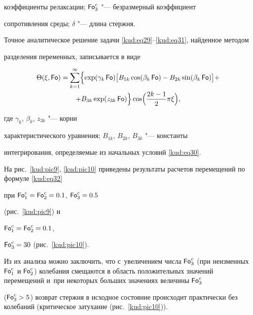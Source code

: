 коэффициенты релаксации; $\operatorname{\sf Fo}_3^c$ "--- безразмерный коэффициент

сопротивления среды; $ \delta$ "--- длина стержня.



Точное аналитическое решение задачи \eqref{kud:eq29}--\eqref{kud:eq31}, найденное методом

разделения переменных, записывается в виде

\begin{multline}

\label{kud:eq32}

\Theta( \xi,\operatorname{\sf Fo})=\sum\limits_{k=1}^\infty \Bigl\{

\exp (\gamma_k \operatorname{\sf Fo})

\bigl[ B_{1k} \cos ( \beta_k \operatorname{\sf Fo})-B_{2k}  \sin ( \beta _k \operatorname{\sf Fo}) \bigr]+\\

+  B_{3k} \exp (z_{3k} \operatorname{\sf Fo}) \Bigr\} \cos \Bigl(\frac{2k-1}2 \pi \xi \Bigr),

\end{multline}

где $ {\gamma }_k $, $\beta_k$, $z_{3k} $ "--- корни

характеристического уравнения; $B_{1k}$, $B_{2k}$, $B_{3k}$ "--- константы

интегрирования, определяемые из начальных условий \eqref{kud:eq30}.



На рис.~\ref{kud:pic9}, \ref{kud:pic10} приведены результаты расчетов перемещений по формуле \eqref{kud:eq32}

при $\operatorname{\sf Fo}_ 1^c =\operatorname{\sf Fo}_2^c =0.1$, $\operatorname{\sf Fo}_{3}^c =0.5$

(рис.~\ref{kud:pic9}) и 

$\operatorname{\sf Fo}_ 1^c =\operatorname{\sf Fo}_2^c =0.1$, 

$\operatorname{\sf Fo}_3^c=30$ (рис.~\ref{kud:pic10}). 

Из их анализа можно заключить, что с~увеличением числа $\operatorname{\sf Fo}_3 ^c$ (при неизменных $\operatorname{\sf Fo}_1^c$ и $\operatorname{\sf Fo}_2^c$) колебания смещаются в область положительных значений перемещений и~при некоторых больших значениях величины $\operatorname{\sf Fo}_3^c$

($ \operatorname{\sf Fo}_3^c>5$) возврат стержня в исходное состояние происходит практически без колебаний (критическое затухание (рис.~\ref{kud:pic10})).





